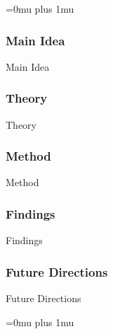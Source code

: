 \Urlmuskip=0mu plus 1mu\relax

\subsubsection{Main Idea}

\noindent
Main Idea

\subsubsection{Theory}

\noindent
Theory

\subsubsection{Method}

\noindent
Method

\subsubsection{Findings}

\noindent
Findings

\subsubsection{Future Directions}

\noindent
Future Directions 

\Urlmuskip=0mu plus 1mu\relax
\pagebreak